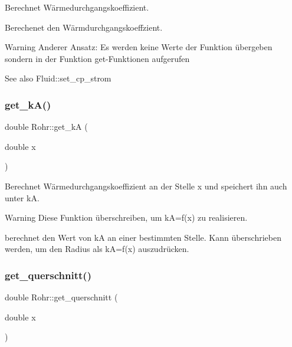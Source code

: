 Berechnet Wärmedurchgangskoeffizient. 

Berechenet den Wärmdurchgangskoeffzient.

\begin{DoxyWarning}{Warning}
Anderer Ansatz\+: Es werden keine Werte der Funktion übergeben sondern in der Funktion get-\/\+Funktionen aufgerufen 
\end{DoxyWarning}
\begin{DoxySeeAlso}{See also}
Fluid\+::set\+\_\+cp\+\_\+strom 
\end{DoxySeeAlso}
\mbox{\label{class_rohr_a07985e6f4a1d9dc8bfcfe2e5cc9f2a60}} 
\subsubsection{\texorpdfstring{get\+\_\+k\+A()}{get\_kA()}\hspace{0.1cm}{\footnotesize\ttfamily [2/2]}}
{\footnotesize\ttfamily double Rohr\+::get\+\_\+kA (\begin{DoxyParamCaption}\item[{double}]{x }\end{DoxyParamCaption})}



Berechnet Wärmedurchgangskoeffizient an der Stelle x und speichert ihn auch unter kA. 

\begin{DoxyWarning}{Warning}
Diese Funktion überschreiben, um kA=f(x) zu realisieren. 
\end{DoxyWarning}
berechnet den Wert von kA an einer bestimmten Stelle. Kann überschrieben werden, um den Radius als kA=f(x) auszudrücken.\mbox{\label{class_rohr_ab8c1e474c5b1510a7c52cb805260ab15}} 
\subsubsection{\texorpdfstring{get\+\_\+querschnitt()}{get\_querschnitt()}}
{\footnotesize\ttfamily double Rohr\+::get\+\_\+querschnitt (\begin{DoxyParamCaption}\item[{double}]{x }\end{DoxyParamCaption})}



